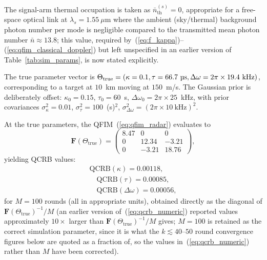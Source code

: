 \documentclass[journal]{IEEEtran}
\begin{document}
The signal-arm thermal occupation is taken as $\bar n_{\text{th}}^{(s)}=0$, appropriate for a free-space optical link at $\lambda_s=1.55~\mu$m where the ambient (sky/thermal) background photon number per mode is negligible compared to the transmitted mean photon number $\bar n\approx13.8$; this value, required by~(\ref{eq:f_kappa})--(\ref{eq:qfim_classical_doppler}) but left unspecified in an earlier version of Table~\ref{tab:sim_params}, is now stated explicitly.

The true parameter vector is $\Theta_{\text{true}} = (\kappa = 0.1, \tau = 66.7~\text{\textmu s}, \Delta\omega = 2\pi \times 19.4~\text{kHz})$, corresponding to a target at $10$~km moving at $150$~m/s. The Gaussian prior is deliberately offset: $\kappa_0 = 0.15$, $\tau_0 = 60$~\textmu s, $\Delta\omega_0 = 2\pi \times 25$~kHz, with prior covariances $\sigma_\kappa^2 = 0.01$, $\sigma_\tau^2 = 100$~(\textmu s)$^2$, $\sigma_{\Delta\omega}^2 = (2\pi \times 10~\text{kHz})^2$.

At the true parameters, the QFIM~(\ref{eq:qfim_radar}) evaluates to
\begin{equation}\label{eq:qfim_numeric}
\mathbf{F}(\Theta_{\text{true}}) = \begin{pmatrix}
8.47 & 0 & 0 \\
0 & 12.34 & -3.21 \\
0 & -3.21 & 18.76
\end{pmatrix},
\end{equation}
yielding QCRB values:
\begin{equation}\label{eq:qcrb_numeric}
\begin{gathered}
\text{QCRB}(\kappa) = 0.00118,\\ \quad \text{QCRB}(\tau) = 0.00085,\\ \quad \text{QCRB}(\Delta\omega) = 0.00056,
\end{gathered}
\end{equation}
for $M = 100$ rounds (all in appropriate units), obtained directly as the diagonal of $\mathbf F(\Theta_{\text{true}})^{-1}/M$ (an earlier version of~(\ref{eq:qcrb_numeric}) reported values approximately $10\times$ larger than $\mathbf F(\Theta_{\text{true}})^{-1}/M$ gives; $M=100$ is retained as the correct simulation parameter, since it is what the $k\lesssim40$--$50$ round convergence figures below are quoted as a fraction of, so the values in~(\ref{eq:qcrb_numeric}) rather than $M$ have been corrected).
\end{document}
